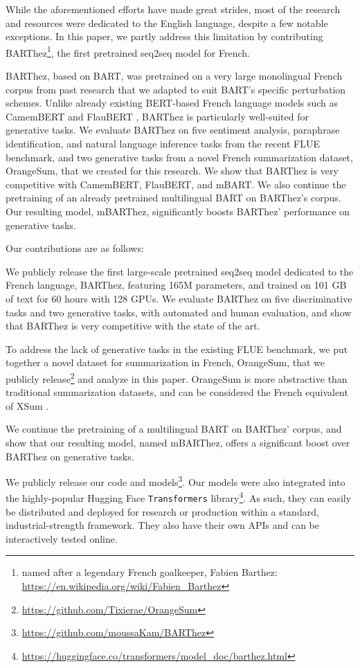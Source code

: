 \documentclass[11pt,a4paper]{article}
\begin{document}
While the aforementioned efforts have made great strides, most of the research and resources were dedicated to the English language, despite a few notable exceptions. In this paper, we partly address this limitation by contributing BARThez\footnote{named after a legendary French goalkeeper, Fabien Barthez: \tiny\url{ https://en.wikipedia.org/wiki/Fabien_Barthez}}, the first pretrained seq2seq model for French.

BARThez, based on BART, was pretrained on a very large monolingual French corpus from past research that we adapted to suit BART's specific perturbation schemes.
Unlike already existing BERT-based French language models such as CamemBERT \cite{martin2019camembert} and FlauBERT \cite{le2019flaubert}, BARThez is particularly well-suited for generative tasks.
We evaluate BARThez on five sentiment analysis, paraphrase identification, and natural language inference tasks from the recent FLUE benchmark, and two generative tasks from a novel French summarization dataset, OrangeSum, that we created for this research. 
We show that BARThez is very competitive with CamemBERT, FlauBERT, and mBART.
We also continue the pretraining of an already pretrained multilingual BART on BARThez's corpus.
Our resulting model, mBARThez, significantly boosts BARThez' performance on generative tasks.

Our contributions are as follows:

\noindent  We publicly release the first large-scale pretrained seq2seq model dedicated to the French language, BARThez, featuring 165M parameters, and trained on 101 GB of text for 60 hours with 128 GPUs.
We evaluate BARThez on five discriminative tasks and two generative tasks, with automated and human evaluation, and show that BARThez is very competitive with the state of the art.

\noindent  To address the lack of generative tasks in the existing FLUE benchmark, we put together a novel dataset for summarization in French, OrangeSum, that we publicly release\footnote{\tiny \url{https://github.com/Tixierae/OrangeSum}} and analyze in this paper.
OrangeSum is more abstractive than traditional summarization datasets, and can be considered the French equivalent of XSum \cite{narayan2018don}.

\noindent  We continue the pretraining of a multilingual BART on BARThez' corpus, and show that
our resulting model, named mBARThez, offers a significant boost over BARThez on generative tasks.

\noindent  We publicly release our code and models\footnote{\tiny \url{https://github.com/moussaKam/BARThez}}.
Our models were also integrated into the highly-popular Hugging Face \texttt{\small Transformers} library\footnote{\tiny \url{https://huggingface.co/transformers/model_doc/barthez.html}}.
As such, they can easily be distributed and deployed for research or production within a standard, industrial-strength framework.
They also have their own APIs and can be interactively tested online.
\end{document}
